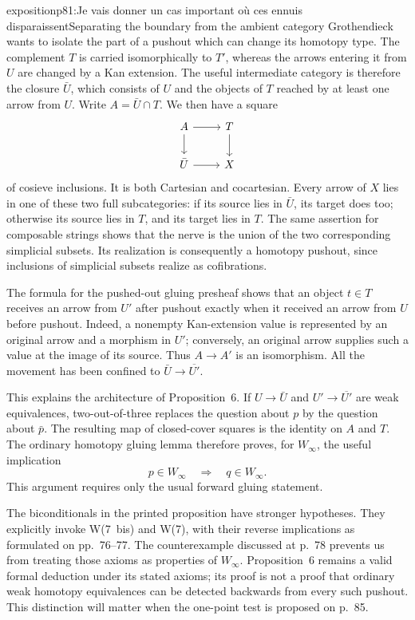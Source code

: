 \begin{dcomment}{exposition}{p81:Je vais donner un cas important où ces ennuis disparaissent}{Separating the boundary from the ambient category}
Grothendieck wants to isolate the part of a pushout which can change its homotopy type. The complement $T$ is carried isomorphically to $T'$, whereas the arrows entering it from $U$ are changed by a Kan extension. The useful intermediate category is therefore the closure $\bar U$, which consists of $U$ and the objects of $T$ reached by at least one arrow from $U$. Write $A=\bar U\cap T$. We then have a square
\[
\begin{tikzcd}
A\arrow[r]\arrow[d]&T\arrow[d]\\
\bar U\arrow[r]&X
\end{tikzcd}
\]
of cosieve inclusions. It is both Cartesian and cocartesian. Every arrow of $X$ lies in one of these two full subcategories: if its source lies in $\bar U$, its target does too; otherwise its source lies in $T$, and its target lies in $T$. The same assertion for composable strings shows that the nerve is the union of the two corresponding simplicial subsets. Its realization is consequently a homotopy pushout, since inclusions of simplicial subsets realize as cofibrations.

The formula for the pushed-out gluing presheaf shows that an object $t\in T$ receives an arrow from $U'$ after pushout exactly when it received an arrow from $U$ before pushout. Indeed, a nonempty Kan-extension value is represented by an original arrow and a morphism in $U'$; conversely, an original arrow supplies such a value at the image of its source. Thus $A\to A'$ is an isomorphism. All the movement has been confined to $\bar U\to\overline{U'}$.

This explains the architecture of Proposition~6. If $U\to\bar U$ and $U'\to\overline{U'}$ are weak equivalences, two-out-of-three replaces the question about $p$ by the question about $\bar p$. The resulting map of closed-cover squares is the identity on $A$ and $T$. The ordinary homotopy gluing lemma therefore proves, for $W_\infty$, the useful implication
\[
p\in W_\infty\quad\Longrightarrow\quad q\in W_\infty.
\]
This argument requires only the usual forward gluing statement.

The biconditionals in the printed proposition have stronger hypotheses. They explicitly invoke W(7~bis) and W(7), with their reverse implications as formulated on pp.~76--77. The counterexample discussed at p.~78 prevents us from treating those axioms as properties of $W_\infty$. Proposition~6 remains a valid formal deduction under its stated axioms; its proof is not a proof that ordinary weak homotopy equivalences can be detected backwards from every such pushout. This distinction will matter when the one-point test is proposed on p.~85.
\end{dcomment}

